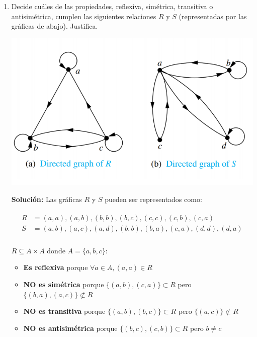 \documentclass[11pt,letterpaper]{article}
\begin{document}
\begin{enumerate}

    \item Decide cuáles de las propiedades, reflexiva, simétrica, transitiva o antisimétrica,
    cumplen las siguientes relaciones $R$ y $S$ (representadas por las gráficas de abajo). Justifica.

        \begin{center}
            \includegraphics[scale=.3]{assets/graphs.png}
        \end{center}

        \textbf{Solución: } Las gráficas $R$ y $S$ pueden ser representados como:

        \begin{equation*} \begin{split} \begin{aligned}
            R &= {(a,a), (a,b), (b,b), (b,c), (c,c), (c,b), (c, a)} \\
            S &= {(a, b), (a, c), (a, d), (b, b), (b,a), (c, a), (d, d), (d, a)} \\
        \end{aligned} \end{split} \end{equation*}

        $R \subseteq A \times A$ donde $A = \{a, b, c\}$:
        \begin{itemize}
            \item \textbf{Es reflexiva} porque $\forall a \in A, (a, a) \in R$
            \item \textbf{NO es simétrica} porque $\{(a, b),(c, a)\} \subset R$ pero $\{(b, a), (a, c)\} \not\subset R$
            \item \textbf{NO es transitiva} porque $\{(a,b), (b, c)\} \subset R$ pero $\{(a, c)\} \not\subset R$
            \item \textbf{NO es antisimétrica} porque $\{(b, c), (c, b)\} \subset R$ pero $b \neq c$
        \end{itemize}


\end{enumerate}
\end{document}
